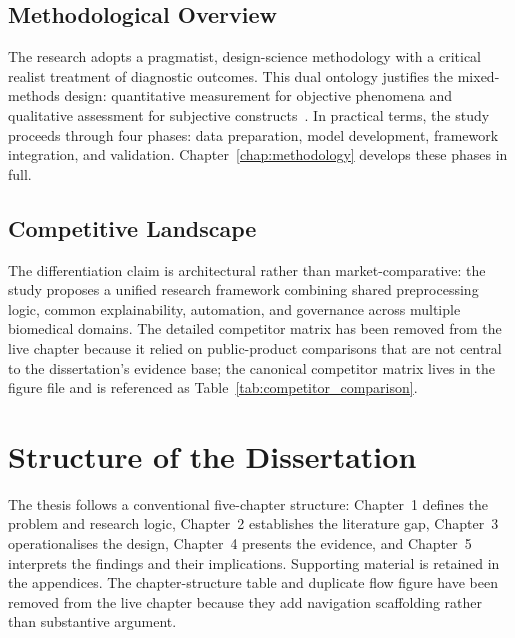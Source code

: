 \label{tab:hypothesis_path_mapping}

\subsection{Methodological Overview}
\label{sec:methodology_overview}

The research adopts a pragmatist, design-science methodology with a critical realist treatment of diagnostic outcomes. This dual ontology justifies the mixed-methods design: quantitative measurement for objective phenomena and qualitative assessment for subjective constructs~\cite{creswell2018research}. In practical terms, the study proceeds through four phases: data preparation, model development, framework integration, and validation. Chapter~\ref{chap:methodology} develops these phases in full.

\label{tab:methodology_phases}

\subsection{Competitive Landscape}
\label{sec:competitor_comparison}

The differentiation claim is architectural rather than market-comparative: the study proposes a unified research framework combining shared preprocessing logic, common explainability, automation, and governance across multiple biomedical domains. The detailed competitor matrix has been removed from the live chapter because it relied on public-product comparisons that are not central to the dissertation's evidence base; the canonical competitor matrix lives in the figure file and is referenced as Table~\ref{tab:competitor_comparison}.

\section{Structure of the Dissertation}
\label{sec:thesis_structure}

The thesis follows a conventional five-chapter structure: Chapter~1 defines the problem and research logic, Chapter~2 establishes the literature gap, Chapter~3 operationalises the design, Chapter~4 presents the evidence, and Chapter~5 interprets the findings and their implications. Supporting material is retained in the appendices. The chapter-structure table and duplicate flow figure have been removed from the live chapter because they add navigation scaffolding rather than substantive argument.

